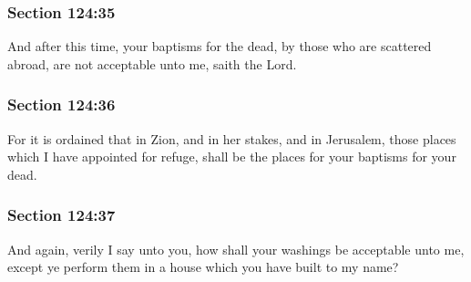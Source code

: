 	\subsubsection{Section 124:35} %
		\label{DC124-35}

		And after this time, your baptisms for the dead, by those who are scattered abroad, are not acceptable unto me, saith the Lord.


	\subsubsection{Section 124:36} %
		\label{DC124-36}

		For it is ordained that in Zion, and in her stakes, and in Jerusalem, those places which I have appointed for refuge, shall be the places for your baptisms for your dead.


	\subsubsection{Section 124:37} %
		\label{DC124-37}

		And again, verily I say unto you, how shall your washings be acceptable unto me, except ye perform them in a house which you have built to my name?


